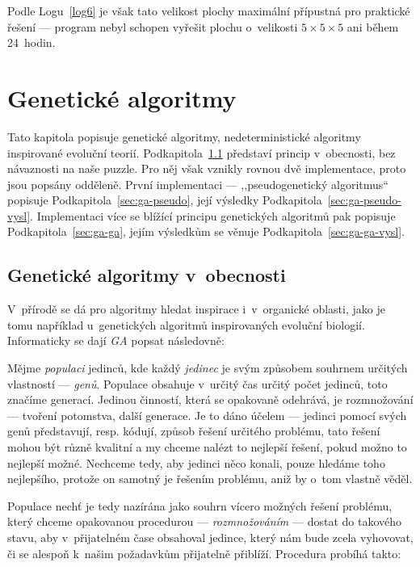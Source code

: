 \documentclass[11pt, titlepage]{report}
\begin{document}
Podle Logu~\ref{log6} je však tato velikost plochy maximální přípustná pro praktické řešení --- program nebyl schopen vyřešit plochu o~velikosti $5 \times 5 \times 5$ ani během 24~hodin.


\chapter{Genetické algoritmy}
\label{ch:ga}

Tato kapitola popisuje genetické algoritmy, nedeterministické algoritmy inspirované evoluční teorií. Podkapitola~\ref{sec:ga-obecne} představí princip v~obecnosti, bez návaznosti na naše puzzle. Pro něj však vznikly rovnou dvě implementace, proto jsou popsány odděleně. První implementaci --- ,,pseudogenetický algoritmus`` popisuje Podkapitola~\ref{sec:ga-pseudo}, její výsledky Podkapitola~\ref{sec:ga-pseudo-vysl}. Implementaci více se blížící principu genetických algoritmů pak popisuje Podkapitola~\ref{sec:ga-ga}, jejím výsledkům se věnuje Podkapitola~\ref{sec:ga-ga-vysl}.

\section{Genetické algoritmy v~obecnosti}
\label{sec:ga-obecne}

V~přírodě se dá pro algoritmy hledat inspirace i~v~organické oblasti, jako je tomu například u~genetických algoritmů inspirovaných evoluční biologií. Informaticky se dají \emph{GA} popsat následovně:

Mějme \emph{populaci} jedinců, kde každý \emph{jedinec} je svým způsobem souhrnem určitých vlastností --- \emph{genů}. Populace obsahuje v~určitý čas určitý počet jedinců, toto značíme generací. Jedinou činností, která se opakovaně odehrává, je rozmnožování --- tvoření potomstva, další generace. Je to dáno účelem --- jedinci pomocí svých genů představují, resp. kódují, způsob řešení určitého problému, tato řešení mohou být různě kvalitní a my chceme nalézt to nejlepší řešení, pokud možno to nejlepší možné. Nechceme tedy, aby jedinci něco konali, pouze hledáme toho nejlepšího, protože on samotný je řešením problému, aniž by o~tom vlastně věděl.

Populace nechť je tedy nazírána jako souhrn vícero možných řešení problému, který chceme opakovanou procedurou --- \emph{rozmnožováním} --- dostat do takového stavu, aby v~přijatelném čase obsahoval jedince, který nám bude zcela vyhovovat, či se alespoň k~našim požadavkům přijatelně přiblíží. Procedura probíhá takto:
\end{document}
